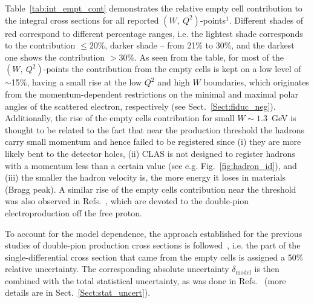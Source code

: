 Table~\ref{tab:int_empt_cont} demonstrates the relative empty cell contribution to the integral cross sections for all reported $(W,~Q^2)$-points$^{1}$. Different shades of red correspond to different percentage ranges, i.e. the lightest shade corresponds to the contribution $\leq 20$\%, darker shade -- from 21\% to 30\%, and the darkest one shows the contribution $>30$\%. As seen from the table, for most of the $(W,~Q^2)$-points the contribution from the empty cells is kept on a low level of $\sim$15\%, having a small rise at the low $Q^{2}$ and high $W$ boundaries, which originates from the momentum-dependent restrictions on the minimal and maximal polar angles of the scattered electron, respectively (see Sect.~\ref{Sect:fiduc_neg}). Additionally, the rise of the empty cells contribution for small $W\sim1.3$~GeV is thought to be related to the fact that near the production threshold the hadrons carry small momentum and hence failed to be registered since (i) they are more likely bent to the detector holes, (ii) CLAS is not designed to register hadrons with a momentum less than a certain value (see e.g. Fig.~\ref{fig:hadron_id}), and (iii) the smaller the hadron velocity is, the more energy it loses in materials (Bragg peak). A similar rise of the empty cells contribution near the threshold was also observed in Refs.~\cite{Fed_an_note:2017,Fed_paper_2018,Fed_an_note:2007,Fedotov:2008aa}, which are devoted to the double-pion electroproduction off the free proton.

To account for the model dependence, the approach established for the previous studies of double-pion production cross sections is followed~\cite{Isupov:2017lnd,Fed_an_note:2017,Golovach}, i.e. the part of the single-differential cross section that came from the empty cells is assigned a 50\% relative uncertainty. The corresponding absolute uncertainty $\delta_{\text{model}}$ is then combined with the total statistical uncertainty, as was done in Refs.~\cite{Isupov:2017lnd,Fed_an_note:2017,Golovach} (more details are in Sect.~\ref{Sect:stat_uncert}).


